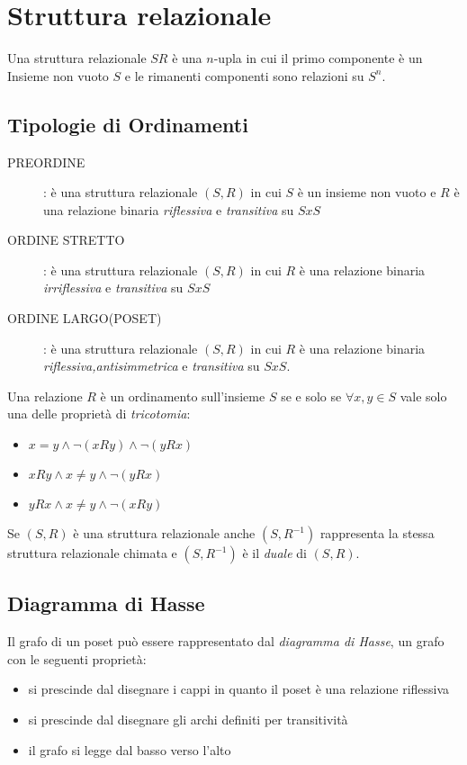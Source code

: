 \section{Struttura relazionale}
Una struttura relazionale $SR$ è una $n$-upla in cui il primo componente è un Insieme
non vuoto $S$ e le rimanenti componenti sono relazioni su $S^n$.

\subsection{Tipologie di Ordinamenti}
\begin{description}
    \item[PREORDINE]: è una struttura relazionale $(S,R)$ in cui $S$ è un insieme non vuoto
          e $R$ è una relazione binaria \emph{riflessiva} e \emph{transitiva} su $S x S$
    \item[ORDINE STRETTO]: è una struttura relazionale $(S,R)$ in cui $R$ è una
          relazione binaria \emph{irriflessiva} e \emph{transitiva} su $S x S$
    \item[ORDINE LARGO(POSET)]: è una struttura relazionale $(S,R)$ in cui $R$ è una
          relazione binaria \emph{riflessiva,antisimmetrica} e \emph{transitiva} su $S x S$.
\end{description}

Una relazione $R$ è un ordinamento sull'insieme $S$ se e solo se $\forall x,y \in S$
vale solo una delle proprietà di \emph{tricotomia}:
\begin{itemize}
    \item $x = y \land \neg(xRy) \land \neg(yRx)$
    \item $xRy \land x \neq y \land \neg(yRx)$
    \item $yRx \land x \neq y \land \neg(xRy)$
\end{itemize}

Se $(S,R)$ è una struttura relazionale anche $(S,R^{-1})$ rappresenta la stessa
struttura relazionale chimata e $(S,R^{-1})$ è il \emph{duale} di $(S,R)$.





\subsection{Diagramma di Hasse}
Il grafo di un poset può essere rappresentato dal \emph{diagramma di Hasse}, un grafo
con le seguenti proprietà:
\begin{itemize}
    \item si prescinde dal disegnare i cappi in quanto il poset è una relazione riflessiva
    \item si prescinde dal disegnare gli archi definiti per transitività
    \item il grafo si legge dal basso verso l'alto
\end{itemize}

